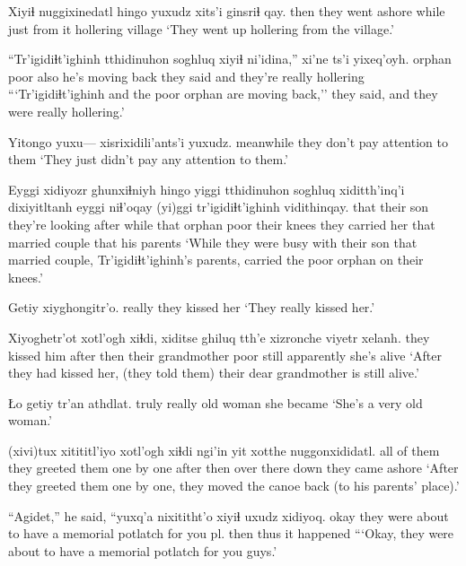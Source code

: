 \documentclass[12pt]{article}
\begin{document}
\gll Xiyiɬ nuggixinedatl         hingo yuxudz xits'i  ginsriɬ qay.
then  {they went ashore} while just  {from it} hollering village
\glt `They went up hollering from the village.'
\glend

\gll ``Tr'igidiɬt'ighinh tthidinuhon soghluq xiyiɬ ni'idina,''       xi'ne     ts'i yixeq'oyh.
{}                orphan poor         also  {he's moving back} {they said} and {they're really hollering}
\glt ```Tr'igidiɬt'ighinh and the poor orphan are moving back,'' they said, and they were really hollering.'
\glend

\gll Yitongo   yuxu--- {xisrixidili'ants'i} yuxudz. 
meanwhile {}   {they don't pay attention to them}
\glt `They just didn't pay any attention to them.'
\glend

\gll Eyggi xidiyozr  ghunxiɬniyh           hingo  yiggi tthidinuhon soghluq xiditth'inq'i dixiyitltanh     eyggi niɬ'oqay (yi)ggi tr'igidiɬt'ighinh vidithinqay.
that  {their son} {they're looking after} while  that  orphan      poor    {their knees} {they carried her} that  {married couple} that  {}                {his parents}
\glt `While they were busy with their son that married couple, Tr'igidiɬt'ighinh's parents, carried the poor orphan on their knees.'
\glend

\gll Getiy  xiyghongitr'o. 
really {they kissed her}
\glt `They really kissed her.'
\glend

\gll Xiyoghetr'ot    xotl'ogh xiɬdi, xiditse ghiluq tth'e xizronche {viyetr xelanh. }
{they kissed him} after  then    {their grandmother} poor still apparently       {she's alive}
\glt `After they had kissed her, (they told them) their dear grandmother is still alive.'
\glend

\gll Ło getiy  tr'an     athdlat.
truly  really {old woman} {she became}
\glt `She's a very old woman.'
\glend

 {(xivi)tux xitititl'iyo}           xotl'ogh xiɬdi ngi'in yit xotthe nuggonxididatl.
{all of them}         {they greeted them one by one} after    then  over   there down {they came ashore}
\glt `After they greeted them one by one, they moved the canoe back (to his parents' place).'
\glend

\gll ``Agidet,'' {he said,} {``yuxq'a nixititht'o}    xiyiɬ                                uxudz xidiyoq.
okay {} {they were about to have a memorial potlatch for you pl.} then  thus {it happened}
\glt ```Okay, they were about to have a memorial potlatch for you guys.'
\glend
\end{document}
